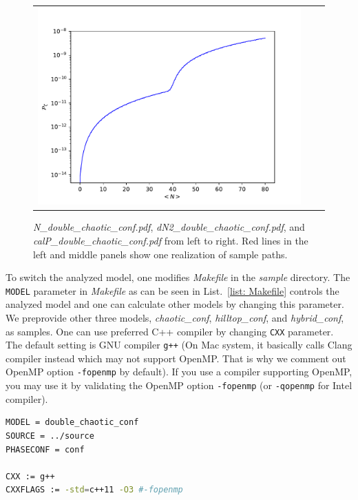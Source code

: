 \documentclass[aps, prd
, preprint
, nofootinbib 
, notitlepage
, superscriptaddress
, longbibliography
]{revtex4-1}
\begin{document}
\begin{figure}
\begin{tabular}{ccc}
\begin{minipage}{0.33\hsize}
			\includegraphics[width=\hsize]{figs/calP_double_chaotic_conf.pdf}
		\end{minipage}
	\end{tabular}
	\caption{\textit{N\_double\_chaotic\_conf.pdf}, \textit{dN2\_double\_chaotic\_conf.pdf}, and \textit{calP\_double\_chaotic\_conf.pdf} from left to right.
	Red lines in the left and middle panels show one realization of sample paths.}
	\label{fig: double_chaotic_conf}
\end{figure}

To switch the analyzed model, one modifies \textit{Makefile} in the \textit{sample} directory. The \texttt{MODEL} parameter in \textit{Makefile} 
as can be seen in List.~\ref{list: Makefile} controls the analyzed model and one can calculate other models by changing this parameter.
We preprovide other three models, \textit{chaotic\_conf}, \textit{hilltop\_conf}, and \textit{hybrid\_conf}, as samples.
One can use preferred C++ compiler by changing \texttt{CXX} parameter. The default setting is GNU compiler \texttt{g++} (On Mac system, it basically calls 
Clang compiler instead which may not support OpenMP. That is why we comment out OpenMP option \texttt{-fopenmp} by default).
If you use a compiler supporting OpenMP, you may use it by validating the OpenMP option \texttt{-fopenmp} (or \texttt{-qopenmp} for Intel compiler).

\begin{lstlisting}[language = bash, caption={\textit{sample/Makefile}}, label=list: Makefile]
MODEL = double_chaotic_conf
SOURCE = ../source
PHASECONF = conf

CXX := g++
CXXFLAGS := -std=c++11 -O3 #-fopenmp
\end{lstlisting}
\end{document}
